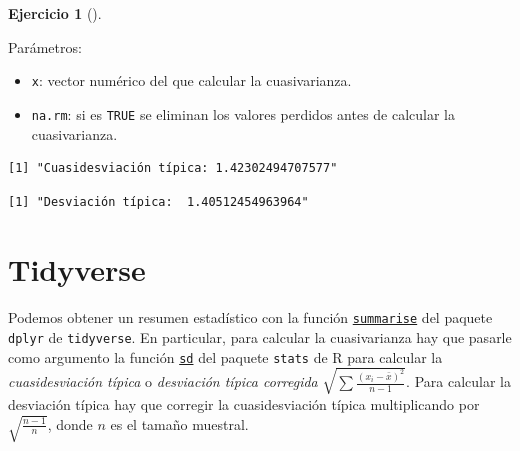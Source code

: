 \documentclass[
  a4paper,
]{scrreport}
\newenvironment{Shaded}{\begin{snugshade}}{\end{snugshade}}
\newcommand{\CommentTok}[1]{\textcolor[rgb]{0.37,0.37,0.37}{#1}}
\newcommand{\DecValTok}[1]{\textcolor[rgb]{0.68,0.00,0.00}{#1}}
\newcommand{\FunctionTok}[1]{\textcolor[rgb]{0.28,0.35,0.67}{#1}}
\newcommand{\NormalTok}[1]{\textcolor[rgb]{0.00,0.23,0.31}{#1}}
\newcommand{\OtherTok}[1]{\textcolor[rgb]{0.00,0.23,0.31}{#1}}
\newcommand{\SpecialCharTok}[1]{\textcolor[rgb]{0.37,0.37,0.37}{#1}}
\newcommand{\StringTok}[1]{\textcolor[rgb]{0.13,0.47,0.30}{#1}}
\providecommand{\tightlist}{%
  \setlength{\itemsep}{0pt}\setlength{\parskip}{0pt}}\usepackage{longtable,booktabs,array}
\theoremstyle{definition}
\newtheorem{exercise}{Ejercicio}[chapter]
\theoremstyle{remark}
\begin{document}
\begin{exercise}[]
\begin{enumerate}
\begin{tcolorbox}
  Parámetros:

  \begin{itemize}
  \tightlist
  \item
    \texttt{x}: vector numérico del que calcular la cuasivarianza.
  \item
    \texttt{na.rm}: si es \texttt{TRUE} se eliminan los valores perdidos
    antes de calcular la cuasivarianza.
  \end{itemize}

\begin{Shaded}
\end{Shaded}

\begin{verbatim}
[1] "Cuasidesviación típica: 1.42302494707577"
\end{verbatim}

\begin{Shaded}
\end{Shaded}

\begin{verbatim}
[1] "Desviación típica:  1.40512454963964"
\end{verbatim}

  \section{Tidyverse}

  Podemos obtener un resumen estadístico con la función
  \href{https://dplyr.tidyverse.org/reference/summarise.html}{\texttt{summarise}}
  del paquete \texttt{dplyr} de \texttt{tidyverse}. En particular, para
  calcular la cuasivarianza hay que pasarle como argumento la función
  \href{https://www.rdocumentation.org/packages/stats/versions/3.6.2/topics/sd}{\texttt{sd}}
  del paquete \texttt{stats} de R para calcular la \emph{cuasidesviación
  típica} o \emph{desviación típica corregida}
  \(\sqrt{\sum \frac{(x_i-\bar x)^2}{n-1}}\). Para calcular la
  desviación típica hay que corregir la cuasidesviación típica
  multiplicando por \(\sqrt{\frac{n-1}{n}}\), donde \(n\) es el tamaño
  muestral.


\end{tcolorbox}
\end{enumerate}
\end{exercise}
\end{document}
